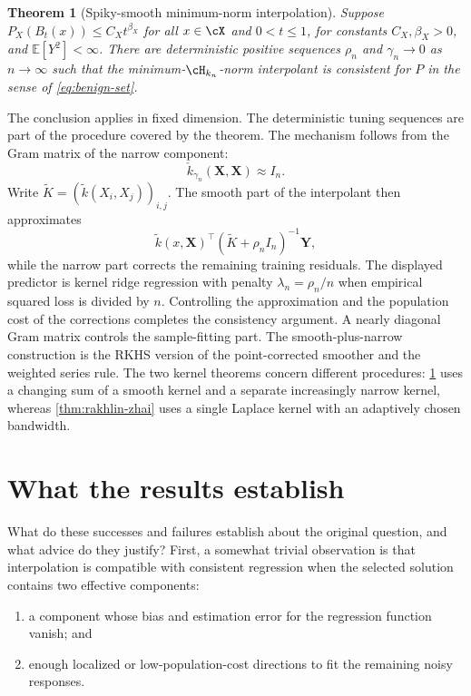 \documentclass[11pt,twoside]{article}
\newcommand{\E}{\mathbb E}
\newtheorem{theorem}{Theorem}[section]
\theoremstyle{definition}
\theoremstyle{remark}
\begin{document}
\begin{theorem}[Spiky-smooth minimum-norm interpolation]
\label{thm:haas}
Suppose $P_X(B_t(x))\le C_Xt^{\beta_X}$ for all $x\in\cX$ and
$0<t\le1$, for constants $C_X,\beta_X>0$, and $\E[Y^2]<\infty$.
There are deterministic positive sequences $\rho_n$ and $\gamma_n\to0$ as
$n\to\infty$
such that the minimum-$\cH_{k_n}$-norm interpolant is consistent for $P$
in the sense of \cref{eq:benign-set}.
\end{theorem}

The conclusion applies in fixed dimension. The deterministic tuning sequences
are part of the procedure covered by the theorem.
The mechanism follows from the Gram matrix of the narrow component:
\[
 \check k_{\gamma_n}(\mathbf X,\mathbf X)\approx I_n.
\]
Write $\widetilde K=(\widetilde k(X_i,X_j))_{i,j}$. The smooth part of the
interpolant then approximates
\[
 \widetilde k(x,\mathbf X)^\top
       (\widetilde K+\rho_n I_n)^{-1}\mathbf Y,
\]
while the narrow part corrects the remaining training residuals. The displayed
predictor is kernel ridge regression with penalty $\lambda_n=\rho_n/n$
when empirical squared loss is divided by $n$. Controlling the approximation
and the population cost of the corrections completes the consistency
argument. A nearly diagonal Gram matrix controls the sample-fitting part.
The smooth-plus-narrow construction is the RKHS version of the point-corrected
smoother and the weighted series rule. The two kernel theorems concern
different procedures:
\cref{thm:haas} uses a changing sum of a smooth kernel and a separate
increasingly narrow kernel, whereas \cref{thm:rakhlin-zhai} uses a single
Laplace kernel with an adaptively chosen bandwidth.

\section{What the results establish}
\label{sec:interpretation}

What do these successes and failures establish about the original question,
and what advice do they justify? 
First, a somewhat trivial observation is that
interpolation is compatible with consistent
regression when the selected solution contains two effective components:

\begin{enumerate}[nosep]%
\item a component whose bias and estimation error for the regression function
      vanish; and
\item enough localized or low-population-cost directions to fit the remaining
      noisy responses.
\end{enumerate}
\end{document}
